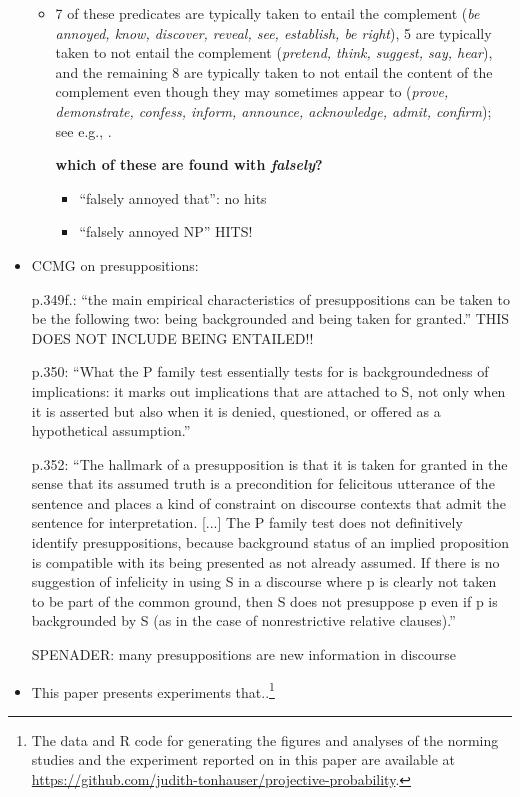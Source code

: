 \documentclass[11pt,fleqn]{article}
\newcommand{\6}{\mbox{$[\hspace*{-.6mm}[$}}
\newcommand{\9}{\mbox{$]\hspace*{-.6mm}]$}}
\begin{document}
\begin{itemize}
\begin{itemize}
\item 7 of these predicates are typically taken to entail the complement ({\em be annoyed, know, discover, reveal, see, establish, be right}), 5 are typically taken to not entail the complement ({\em pretend, think, suggest, say, hear}), and the remaining 8 are typically taken to not entail the content of the complement even though they may sometimes appear to ({\em prove, demonstrate, confess, inform, announce, acknowledge, admit, confirm}); see e.g., \citealt{schlenker10,swanson2012,anand-hacquard2014}.

{\bf which of these are found with {\em falsely}?}

\begin{itemize}

\item ``falsely annoyed that'': no hits

\item ``falsely annoyed NP'' HITS!


\end{itemize}

\end{itemize}


\item CCMG on presuppositions:

p.349f.: ``the main empirical characteristics of presuppositions can be taken to be the following two: being backgrounded and being taken for granted.'' THIS DOES NOT INCLUDE BEING ENTAILED!! 

p.350: ``What the P family test essentially tests for is backgroundedness of implications: it marks out implications that are attached to S, not only when it is asserted but also when it is denied, questioned, or offered as a hypothetical assumption.''

p.352: ``The hallmark of a presupposition is that it is taken for granted in the sense that its assumed truth is a precondition for felicitous utterance of the sentence and places a kind of constraint on discourse contexts that admit the sentence for interpretation. [...] The P family test does not definitively identify presuppositions, because background status of an implied proposition is compatible with its being presented as not already assumed. If there is no suggestion of infelicity in using S in a discourse where p is clearly not taken to be part of the common ground, then S does not presuppose p even if p is backgrounded by S (as in the case of nonrestrictive relative clauses).''

SPENADER: many presuppositions are new information in discourse 

\item This paper presents experiments that..\footnote{\label{f-github}The
data and R code for generating the figures and analyses
of the norming studies and the experiment reported on in this paper are available at \url{https://github.com/judith-tonhauser/projective-probability}.}

\end{itemize}
\end{document}
